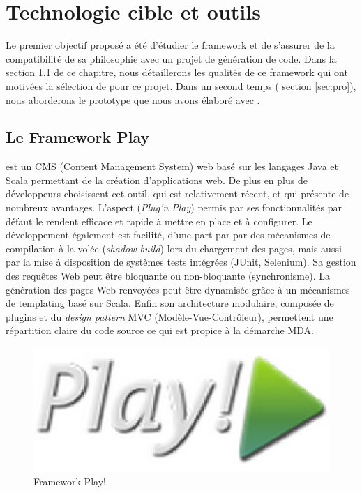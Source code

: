 \chapter{Technologie cible et outils}\label{chap:met}
Le premier objectif proposé a été d'étudier le framework \kwplay et de s'assurer de la compatibilité de sa philosophie avec un projet de génération de code. Dans la section \ref{sec:pla} de ce chapitre, nous détaillerons les qualités de ce framework qui ont motivées la sélection de \kwplay pour ce projet. Dans un second temps (\cf{} section \ref{sec:pro}), nous aborderons le prototype que nous avons élaboré avec \kwplay. 


\section{Le Framework Play}\label{sec:pla}

\kwplay{} est un CMS (Content Management System) web basé sur les langages Java et Scala permettant de la création d'applications web. De plus en plus de développeurs choisissent cet outil, qui est relativement récent, et qui présente de nombreux avantages. L'aspect  (\textit{Plug'n Play}) permis par ses fonctionnalités par défaut le rendent efficace et rapide à mettre en place et à configurer. Le développement également est facilité, d'une part par par des mécanismes de compilation à la volée (\textit{shadow-build}) lors du chargement des pages, mais aussi par la mise à disposition de systèmes tests intégrées (JUnit, Selenium). Sa gestion des requêtes Web peut être bloquante ou non-bloquante (synchronisme). La génération des pages Web renvoyées peut être dynamisée grâce à un mécanismes de templating basé sur Scala. Enfin son architecture modulaire, composée de plugins et du \textit{design pattern} MVC (Modèle-Vue-Contrôleur), permettent une répartition claire du code source ce qui est propice à la démarche MDA. %

\begin{figure}[htb]
  \centering
  \includegraphics[scale=.3]{img/logoPlay.eps}
  \caption{Framework Play!}
  \label{fig:play}
\end{figure}


